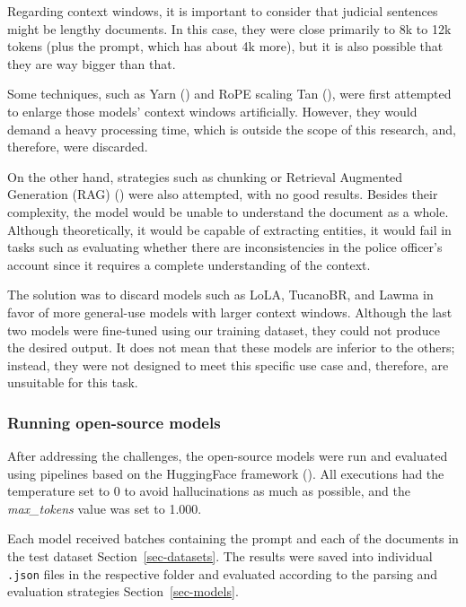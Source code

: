 \documentclass[
  12pt,
]{article}
\begin{document}
Regarding context windows, it is important to consider that judicial
sentences might be lengthy documents. In this case, they were close
primarily to 8k to 12k tokens (plus the prompt, which has about 4k
more), but it is also possible that they are way bigger than that.

Some techniques, such as Yarn () and RoPE scaling Tan
(), were first attempted to
enlarge those models' context windows artificially. However, they would
demand a heavy processing time, which is outside the scope of this
research, and, therefore, were discarded.

On the other hand, strategies such as chunking or Retrieval Augmented
Generation (RAG) () were also attempted, with no good results. Besides their
complexity, the model would be unable to understand the document as a
whole. Although theoretically, it would be capable of extracting
entities, it would fail in tasks such as evaluating whether there are
inconsistencies in the police officer's account since it requires a
complete understanding of the context.

The solution was to discard models such as LoLA, TucanoBR, and Lawma in
favor of more general-use models with larger context windows. Although
the last two models were fine-tuned using our training dataset, they
could not produce the desired output. It does not mean that these models
are inferior to the others; instead, they were not designed to meet this
specific use case and, therefore, are unsuitable for this task.

\subsubsection{Running open-source
models}\label{running-open-source-models}

After addressing the challenges, the open-source models were run and
evaluated using pipelines based on the HuggingFace framework
(). All
executions had the temperature set to 0 to avoid hallucinations as much
as possible, and the \emph{max\_tokens} value was set to 1.000.

Each model received batches containing the prompt and each of the
documents in the test dataset Section~\ref{sec-datasets}. The results
were saved into individual \texttt{.json} files in the respective folder
and evaluated according to the parsing and evaluation strategies
Section~\ref{sec-models}.
\end{document}
